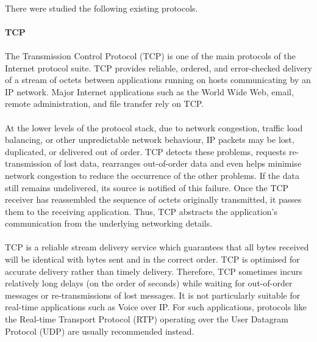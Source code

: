 \paragraph{}
There were studied the following existing protocols.

\paragraph{} \textbf{TCP}
\paragraph{}
The Transmission Control Protocol (TCP) is one of the main protocols of the Internet protocol suite. TCP provides reliable, ordered, and error-checked delivery of a stream of octets between applications running on hosts communicating by an IP network. Major Internet applications such as the World Wide Web, email, remote administration, and file transfer rely on TCP.
\paragraph{}
At the lower levels of the protocol stack, due to network congestion, traffic load balancing, or other unpredictable network behaviour, IP packets may be lost, duplicated, or delivered out of order. TCP detects these problems, requests re-transmission of lost data, rearranges out-of-order data and even helps minimise network congestion to reduce the occurrence of the other problems. If the data still remains undelivered, its source is notified of this failure. Once the TCP receiver has reassembled the sequence of octets originally transmitted, it passes them to the receiving application. Thus, TCP abstracts the application's communication from the underlying networking details.
\paragraph{}
TCP is a reliable stream delivery service which guarantees that all bytes received will be identical with bytes sent and in the correct order. TCP is optimised for accurate delivery rather than timely delivery. Therefore, TCP sometimes incurs relatively long delays (on the order of seconds) while waiting for out-of-order messages or re-transmissions of lost messages. It is not particularly suitable for real-time applications such as Voice over IP. For such applications, protocols like the Real-time Transport Protocol (RTP) operating over the User Datagram Protocol (UDP) are usually recommended instead.

